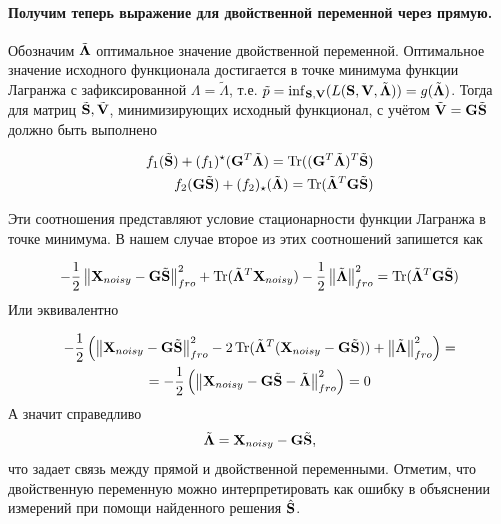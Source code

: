 \paragraph{Получим теперь выражение для двойственной переменной через прямую.}


Обозначим
$\tilde{\mathbf{\Lambda}}$ оптимальное значение двойственной переменной.
Оптимальное значение исходного функционала достигается в точке минимума
функции Лагранжа с зафиксированной $\Lambda = \tilde{\Lambda}$, т.е.
$ \tilde{p} = \inf_{\mathbf{S}, \mathbf{V}}(L(\mathbf{S}, \mathbf{V}, \tilde{\mathbf{\Lambda}})) =
g(\tilde{\mathbf{\Lambda}})$. Тогда для матриц $\tilde{\mathbf{S}},
\tilde{\mathbf{V}}$, минимизирующих исходный функционал, с учётом $\tilde{\mathbf{V}} =
\mathbf{G}\tilde{\mathbf{S}}$ должно быть выполнено

\begin{align}
    f_1(\tilde{\mathbf{S}}) + (f_1)^{\star}(\mathbf{G}^T\tilde{\mathbf{\Lambda}}) = \operatorname*{Tr}((\mathbf{G}^T\tilde{\mathbf{\Lambda}})^T\tilde{\mathbf{S}}) \label{eq:dual_kkt_conditions_1}\\
    f_2(\mathbf{G}\tilde{\mathbf{S}}) + (f_2)_{\star}(\tilde{\mathbf{\Lambda}}) = \operatorname*{Tr}(\tilde{\mathbf{\Lambda}}^T\mathbf{G}\tilde{\mathbf{S}}) \label{eq:dual_kkt_conditions_2}
\end{align}

Эти соотношения представляют условие стационарности функции Лагранжа в точке минимума.
В нашем случае второе из этих соотношений запишется как

\begin{equation*}
    - \frac{1}{2} \left\lVert\mathbf{X}_{noisy} - \mathbf{G}\tilde{\mathbf{S}}\right\rVert^2_{fro} + \operatorname*{Tr}({\tilde{\mathbf{\Lambda}}^T\mathbf{X}_{noisy}}) - \frac{1}{2}\left\lVert\tilde{\mathbf{\Lambda}}\right\rVert^2_{fro}=
    \operatorname*{Tr}(\tilde{\mathbf{\Lambda}}^T\mathbf{G}\tilde{\mathbf{S}})
\end{equation*}
Или эквивалентно

\begin{multline*}
    - \frac{1}{2}\left(\left\lVert\mathbf{X}_{noisy}-\mathbf{G}\tilde{\mathbf{S}}\right\rVert^2_{fro} -
        2\operatorname*{Tr}({\tilde{\mathbf{\Lambda}}^T(\mathbf{X}_{noisy}-\mathbf{G}\tilde{\mathbf{S}})}) +
    \left\lVert\tilde{\mathbf{\Lambda}}\right\rVert^2_{fro}\right) =\\
    =-\frac{1}{2}\left(\left\lVert\mathbf{X}_{noisy} - \mathbf{G}\tilde{\mathbf{S}} - \tilde{\mathbf{\Lambda}}\right\rVert^2_{fro}\right)
    =0
\end{multline*}
А значит справедливо
\begin{equation}
    \tilde{\mathbf{\Lambda}} = \mathbf{X}_{noisy} - \mathbf{G}\tilde{\mathbf{S}},
    \label{eq:dual_variable}
\end{equation}
что задает связь между прямой и двойственной переменными. Отметим, что двойственную
переменную можно интерпретировать как ошибку в объяснении измерений при помощи
найденного решения $\hat{\mathbf{S}}$.

